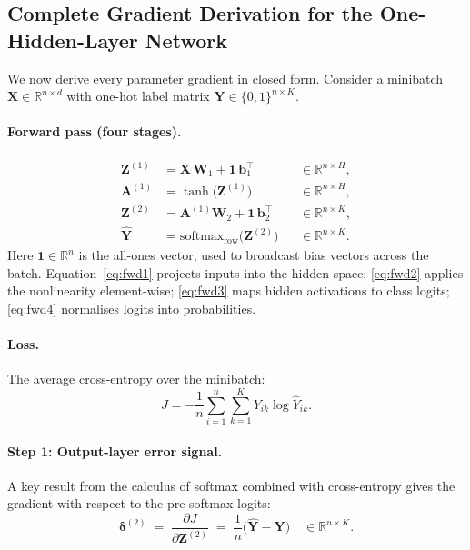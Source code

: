 \documentclass[11pt]{article}
\newcommand{\R}{\mathbb{R}}
\newcommand{\bX}{\mathbf{X}}
\newcommand{\bW}{\mathbf{W}}
\newcommand{\bb}{\mathbf{b}}
\newcommand{\bY}{\mathbf{Y}}
\newcommand{\bZ}{\mathbf{Z}}
\newcommand{\bA}{\mathbf{A}}
\newcommand{\bone}{\mathbf{1}}
\newcommand{\bdelta}{\boldsymbol{\delta}}
\begin{document}
\subsection{Complete Gradient Derivation for the One-Hidden-Layer Network}
\label{sec:gradient-derivation}

We now derive every parameter gradient in closed form.  Consider a minibatch
$\bX\in\R^{n\times d}$ with one-hot label matrix $\bY\in\{0,1\}^{n\times K}$.

\paragraph{Forward pass (four stages).}
\begin{align}
  \bZ^{(1)} &= \bX\,\bW_1 + \bone\,\bb_1^\top
    & &\in\R^{n\times H}, \label{eq:fwd1}\\
  \bA^{(1)} &= \tanh\!\bigl(\bZ^{(1)}\bigr)
    & &\in\R^{n\times H}, \label{eq:fwd2}\\
  \bZ^{(2)} &= \bA^{(1)}\bW_2 + \bone\,\bb_2^\top
    & &\in\R^{n\times K}, \label{eq:fwd3}\\
  \hat{\bY}  &= \mathrm{softmax}_{\text{row}}\!\bigl(\bZ^{(2)}\bigr)
    & &\in\R^{n\times K}. \label{eq:fwd4}
\end{align}
Here $\bone\in\R^n$ is the all-ones vector, used to broadcast bias vectors across the batch.
Equation~\eqref{eq:fwd1} projects inputs into the hidden space; \eqref{eq:fwd2} applies the
nonlinearity element-wise; \eqref{eq:fwd3} maps hidden activations to class logits;
\eqref{eq:fwd4} normalises logits into probabilities.

\paragraph{Loss.}
The average cross-entropy over the minibatch:
\begin{equation}\label{eq:batch-ce}
  J = -\frac{1}{n}\sum_{i=1}^{n}\sum_{k=1}^{K} Y_{ik}\log\hat{Y}_{ik}.
\end{equation}

\paragraph{Step 1: Output-layer error signal.}
A key result from the calculus of softmax combined with cross-entropy gives the gradient
with respect to the pre-softmax logits:
\begin{equation}\label{eq:delta2}
  \bdelta^{(2)}
  \;=\;\frac{\partial J}{\partial \bZ^{(2)}}
  \;=\;\frac{1}{n}\bigl(\hat{\bY}-\bY\bigr)
  \quad\in\R^{n\times K}.
\end{equation}
\end{document}
